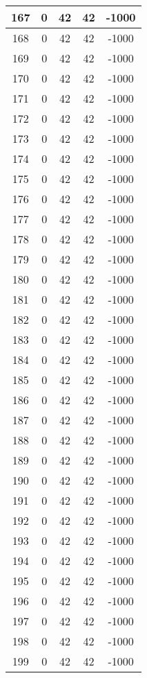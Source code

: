 \documentclass[letterpaper, 12pt]{article}
\begin{document}
\begin{longtable}{|c|c|c|c|c|}
\hline
167 & 0 & 42 & 42 & -1000 \\
\hline
168 & 0 & 42 & 42 & -1000 \\
\hline
169 & 0 & 42 & 42 & -1000 \\
\hline
170 & 0 & 42 & 42 & -1000 \\
\hline
171 & 0 & 42 & 42 & -1000 \\
\hline
172 & 0 & 42 & 42 & -1000 \\
\hline
173 & 0 & 42 & 42 & -1000 \\
\hline
174 & 0 & 42 & 42 & -1000 \\
\hline
175 & 0 & 42 & 42 & -1000 \\
\hline
176 & 0 & 42 & 42 & -1000 \\
\hline
177 & 0 & 42 & 42 & -1000 \\
\hline
178 & 0 & 42 & 42 & -1000 \\
\hline
179 & 0 & 42 & 42 & -1000 \\
\hline
180 & 0 & 42 & 42 & -1000 \\
\hline
181 & 0 & 42 & 42 & -1000 \\
\hline
182 & 0 & 42 & 42 & -1000 \\
\hline
183 & 0 & 42 & 42 & -1000 \\
\hline
184 & 0 & 42 & 42 & -1000 \\
\hline
185 & 0 & 42 & 42 & -1000 \\
\hline
186 & 0 & 42 & 42 & -1000 \\
\hline
187 & 0 & 42 & 42 & -1000 \\
\hline
188 & 0 & 42 & 42 & -1000 \\
\hline
189 & 0 & 42 & 42 & -1000 \\
\hline
190 & 0 & 42 & 42 & -1000 \\
\hline
191 & 0 & 42 & 42 & -1000 \\
\hline
192 & 0 & 42 & 42 & -1000 \\
\hline
193 & 0 & 42 & 42 & -1000 \\
\hline
194 & 0 & 42 & 42 & -1000 \\
\hline
195 & 0 & 42 & 42 & -1000 \\
\hline
196 & 0 & 42 & 42 & -1000 \\
\hline
197 & 0 & 42 & 42 & -1000 \\
\hline
198 & 0 & 42 & 42 & -1000 \\
\hline
199 & 0 & 42 & 42 & -1000 \\
\hline
\end{longtable}
\end{document}
